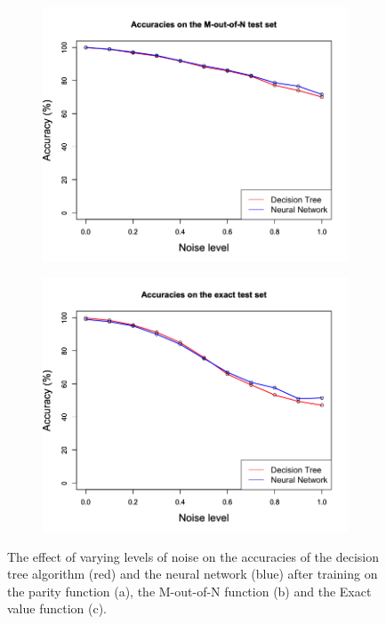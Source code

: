 \documentclass[letterpaper]{article} %
\begin{document}
\begin{figure}[p]
    \begin{subfigure}[t]{0.4\textwidth}
        \centering
        \includegraphics[width = 1 \linewidth]{Figures/SBF_MU.png}
        \caption{}
        \label{fig:SBF_MU}
    \end{subfigure}%

    \begin{subfigure}[t]{0.4\textwidth}
        \centering
        \includegraphics[width = 1 \linewidth]{Figures/SBF_EU.png}
        \caption{}
        \label{fig:SBF_EU}
    \end{subfigure}%
    \caption{The effect of varying levels of noise on the accuracies of the decision tree algorithm (red) and the neural network (blue) after training on the parity function (a), the M-out-of-N function (b) and the Exact value function (c).}
    \label{fig:SBF_noise}
\end{figure}
\end{document}

